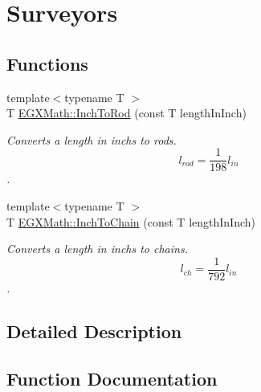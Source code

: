 \hypertarget{group___e_g_x_math-_conversions-_length_conversions-_imperial-_inch-_surveyors}{}\section{Surveyors}
\label{group___e_g_x_math-_conversions-_length_conversions-_imperial-_inch-_surveyors}
\subsection*{Functions}
\begin{DoxyCompactItemize}
\item 
{\footnotesize template$<$typename T $>$ }\\T \mbox{\hyperlink{group___e_g_x_math-_conversions-_length_conversions-_imperial-_inch-_surveyors_gaa045e03f8adf2c109c70a2446ac391ef}{E\+G\+X\+Math\+::\+Inch\+To\+Rod}} (const T length\+In\+Inch)
\begin{DoxyCompactList}\small\item\em Converts a length in inchs to rods. \[ l_{rod}= \frac{1}{198} l_{in} \]. \end{DoxyCompactList}\item 
{\footnotesize template$<$typename T $>$ }\\T \mbox{\hyperlink{group___e_g_x_math-_conversions-_length_conversions-_imperial-_inch-_surveyors_ga9345ec4d847b89c4e61531f8044d10d8}{E\+G\+X\+Math\+::\+Inch\+To\+Chain}} (const T length\+In\+Inch)
\begin{DoxyCompactList}\small\item\em Converts a length in inchs to chains. \[ l_{ch}= \frac{1}{792} l_{in} \]. \end{DoxyCompactList}\end{DoxyCompactItemize}


\subsection{Detailed Description}


\subsection{Function Documentation}
\mbox{\label{group___e_g_x_math-_conversions-_length_conversions-_imperial-_inch-_surveyors_ga9345ec4d847b89c4e61531f8044d10d8}} 
